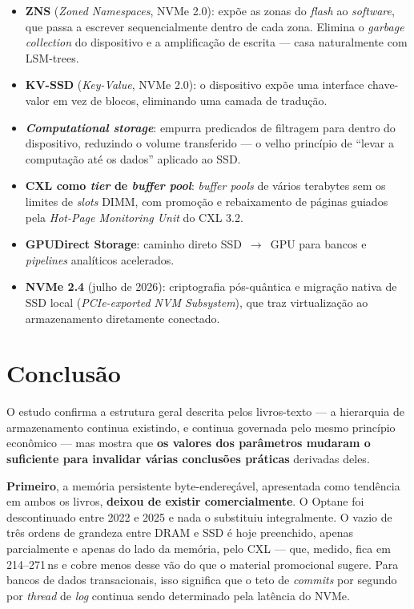 \documentclass[11pt,a4paper]{article}
\begin{document}
\begin{itemize}
\item \textbf{ZNS} (\emph{Zoned Namespaces}, NVMe 2.0): expõe as zonas do \emph{flash} ao
      \emph{software}, que passa a escrever sequencialmente dentro de cada zona. Elimina o
      \emph{garbage collection} do dispositivo e a amplificação de escrita --- casa
      naturalmente com LSM-trees.
\item \textbf{KV-SSD} (\emph{Key-Value}, NVMe 2.0): o dispositivo expõe uma interface
      chave-valor em vez de blocos, eliminando uma camada de tradução.
\item \textbf{\emph{Computational storage}}: empurra predicados de filtragem para dentro do
      dispositivo, reduzindo o volume transferido --- o velho princípio de ``levar a
      computação até os dados'' aplicado ao SSD.
\item \textbf{CXL como \emph{tier} de \emph{buffer pool}}: \emph{buffer pools} de vários
      terabytes sem os limites de \emph{slots} DIMM, com promoção e rebaixamento de páginas
      guiados pela \emph{Hot-Page Monitoring Unit} do CXL 3.2.
\item \textbf{GPUDirect Storage}: caminho direto SSD~$\rightarrow$~GPU para bancos e
      \emph{pipelines} analíticos acelerados.
\item \textbf{NVMe 2.4} (julho de 2026): criptografia pós-quântica e migração nativa de SSD
      local (\emph{PCIe-exported NVM Subsystem}), que traz virtualização ao armazenamento
      diretamente conectado.
\end{itemize}

\section{Conclusão}

O estudo confirma a estrutura geral descrita pelos livros-texto --- a hierarquia de
armazenamento continua existindo, e continua governada pelo mesmo princípio econômico ---
mas mostra que \textbf{os valores dos parâmetros mudaram o suficiente para invalidar
várias conclusões práticas} derivadas deles.

\textbf{Primeiro}, a memória persistente byte-endereçável, apresentada como tendência em
ambos os livros, \textbf{deixou de existir comercialmente}. O Optane foi descontinuado
entre 2022 e 2025 e nada o substituiu integralmente. O vazio de três ordens de grandeza
entre DRAM e SSD é hoje preenchido, apenas parcialmente e apenas do lado da memória, pelo
CXL --- que, medido, fica em 214--271\,ns e cobre menos desse vão do que o material
promocional sugere. Para bancos de dados transacionais, isso significa que o teto de \emph{commits} por
segundo por \emph{thread} de \emph{log} continua sendo determinado pela latência do NVMe.
\end{document}
